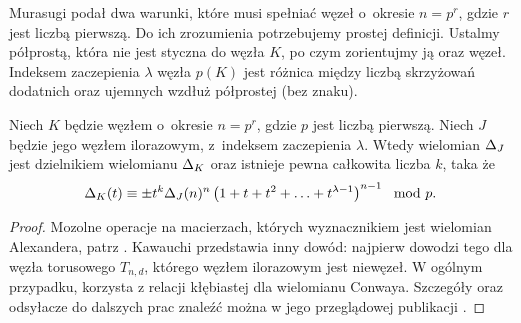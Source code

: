 Murasugi podał dwa warunki, które musi spełniać węzeł o~okresie $n = p^r$, gdzie $r$ jest liczbą pierwszą.
Do ich zrozumienia potrzebujemy prostej definicji.
Ustalmy półprostą, która nie jest styczna do węzła $K$, po czym zorientujmy ją oraz węzeł.
Indeksem zaczepienia $\lambda$ węzła $p(K)$ jest różnica między liczbą skrzyżowań dodatnich oraz ujemnych wzdłuż półprostej (bez znaku).

\begin{proposition}
%
\label{prp:murasugi_periodic}%
    Niech $K$ będzie węzłem o~okresie $n = p^r$, gdzie $p$ jest liczbą pierwszą.
    Niech $J$ będzie jego węzłem ilorazowym, z~indeksem zaczepienia $\lambda$.
    Wtedy wielomian $\Delta_J$ jest dzielnikiem wielomianu $\Delta_K$ oraz istnieje pewna całkowita liczba $k$, taka że
    \begin{equation}
        \Delta_K(t) \equiv \pm t^k \Delta_J(n)^n \left(1 + t + t^2 + \ldots + t^{\lambda - 1}\right)^{n-1} \mod p.
    \end{equation}
\end{proposition}

\begin{proof}
    Mozolne operacje na macierzach, których wyznacznikiem jest wielomian Alexandera, patrz \cite{murasugi1971}.
    Kawauchi przedstawia inny dowód: najpierw dowodzi tego dla węzła torusowego $T_{n, d}$, którego węzłem ilorazowym jest niewęzeł.
    W ogólnym przypadku, korzysta z relacji kłębiastej dla wielomianu Conwaya.
    Szczegóły oraz odsyłacze do dalszych prac znaleźć można w jego przeglądowej publikacji \cite[s. 122-124]{kawauchi1996}.
\end{proof}

